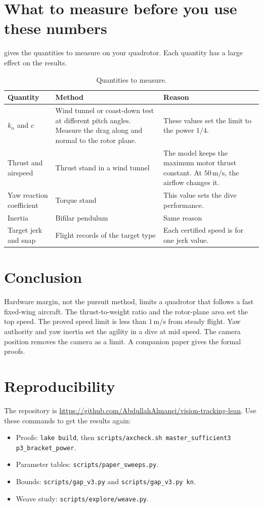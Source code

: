 \documentclass[11pt]{article}
\newcommand{\ms}{\,\mathrm{m/s}}
\begin{document}
\section{What to measure before you use these numbers}
\label{sec:measure}

 gives the quantities to measure on your quadrotor.
Each quantity has a large effect on the results.

\begin{table}[h]
\centering
\caption{Quantities to measure.}
\label{tab:measure}
\small
\begin{tabularx}{\linewidth}{@{}lYY@{}}
\toprule
Quantity & Method & Reason \\
\midrule
$k_n$ and $c$ & Wind tunnel or coast-down test at different pitch angles. Measure the drag along and normal to the rotor plane. & These values set the limit to the power $1/4$. \\
Thrust and airspeed & Thrust stand in a wind tunnel & The model keeps the maximum motor thrust constant. At $50\ms$, the airflow changes it. \\
Yaw reaction coefficient & Torque stand & This value sets the dive performance. \\
Inertia & Bifilar pendulum & Same reason \\
Target jerk and snap & Flight records of the target type & Each certified speed is for one jerk value. \\
\bottomrule
\end{tabularx}
\end{table}

\section{Conclusion}

Hardware margin, not the pursuit method, limits a quadrotor that follows a fast fixed-wing
aircraft.
The thrust-to-weight ratio and the rotor-plane area set the top speed.
The proved speed limit is less than $1\ms$ from steady flight.
Yaw authority and yaw inertia set the agility in a dive at mid speed.
The camera position removes the camera as a limit.
A companion paper gives the formal proofs.

\section*{Reproducibility}

The repository is \url{https://github.com/AbdullahAlmanei/vision-tracking-lean}.
Use these commands to get the results again:
\begin{itemize}\raggedright
\item Proofs: \texttt{lake build}, then \texttt{scripts/axcheck.sh master\_sufficient3 p3\_bracket\_power}.
\item Parameter tables: \texttt{scripts/paper\_sweeps.py}.
\item Bounds: \texttt{scripts/gap\_v3.py} and \texttt{scripts/gap\_v3.py kn}.
\item Weave study: \texttt{scripts/explore/weave.py}.
\end{itemize}
\end{document}
